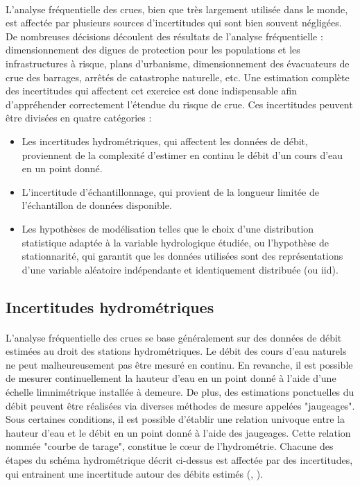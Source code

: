 \documentclass[11pt]{article}
\begin{document}
	\paragraph{} L'analyse fréquentielle des crues, bien que très largement utilisée dans le monde, est affectée par plusieurs sources d'incertitudes qui sont bien souvent négligées. De nombreuses décisions découlent des résultats de l'analyse fréquentielle : dimensionnement des digues de protection pour les populations et les infrastructures à risque, plans d'urbanisme, dimensionnement des évacuateurs de crue des barrages, arrêtés de catastrophe naturelle, etc. Une estimation complète des incertitudes qui affectent cet exercice est donc indispensable afin d'appréhender correctement l'étendue du risque de crue. Ces incertitudes peuvent être divisées en quatre catégories :
	\begin{itemize}
	
		\item Les incertitudes hydrométriques, qui affectent les données de débit, proviennent de la complexité d'estimer en continu le débit d'un cours d'eau en un point donné.
		
		\item L'incertitude d'échantillonnage, qui provient de la longueur limitée de l'échantillon de données disponible.

		\item Les hypothèses de modélisation telles que le choix d'une distribution statistique adaptée à la variable hydrologique étudiée, ou l'hypothèse de stationnarité, qui garantit que les données utilisées sont des représentations d'une variable aléatoire indépendante et identiquement distribuée (ou iid).
	\end{itemize}
	
	\subsection{Incertitudes hydrométriques}
	
	\paragraph{} L'analyse fréquentielle des crues se base généralement sur des données de débit estimées au droit des stations hydrométriques. Le débit des cours d'eau naturels ne peut malheureusement pas être mesuré en continu. En revanche, il est possible de mesurer continuellement la hauteur d'eau en un point donné à l'aide d'une échelle limnimétrique installée à demeure. De plus, des estimations ponctuelles du débit peuvent être réalisées via diverses méthodes de mesure appelées "jaugeages". Sous certaines conditions, il est possible d'établir une relation univoque entre la hauteur d'eau et le débit en un point donné à l'aide des jaugeages. Cette relation nommée "courbe de tarage", constitue le cœur de l'hydrométrie. Chacune des étapes du schéma hydrométrique décrit ci-dessus est affectée par des incertitudes, qui entrainent une incertitude autour des débits estimés (\citet{mcmillan_benchmarking_2012}, \citet{puechberty_charte_2017}). 
	
\end{document}
